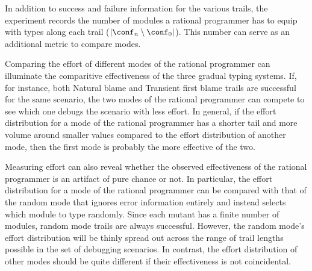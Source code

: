 
In addition to success and failure information for the various trails, the
experiment records the number of modules a rational programmer has
to equip with types along each trail ($\lvert \conf_n \setminus \conf_0
\rvert$). This number can serve as an additional metric to compare modes.

Comparing the effort of different modes of the rational programmer can
illuminate the comparitive effectiveness of the three gradual typing
systems. If, for instance, both
Natural blame and Transient first blame trails are successful for the same scenario, the two modes of
the rational programmer can compete to see which one debugs the
scenario with less effort. In general, if the effort distribution for a mode of
the rational programmer has a shorter tail and more volume around smaller values
compared to the effort distribution of another mode, then the first mode is
probably the more effective of the two.

Measuring effort can also reveal whether the observed effectiveness of the
rational programmer is an artifact of pure chance or not.
In particular, the effort distribution for a mode of the rational programmer can be compared with that of
the random mode that ignores error information entirely and instead selects which
module to type randomly.  Since each mutant has a finite number of
modules, random mode trails are always successful. However, the random mode's effort
distribution will be thinly spread out across the range of trail lengths possible
in the set of debugging scenarios.
In contrast, the effort distribution of other modes should be quite different if their effectiveness is not coincidental.

